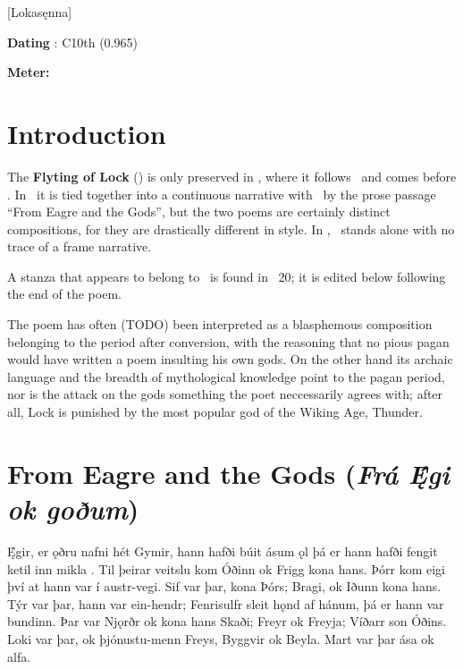 [Lokasęnna]
\def\thisBookCode{Lokasenna}

\begin{flushright}%
\textbf{Dating} \parencite{Sapp2022}: C10th (0.965)

\textbf{Meter:} \Ljodahattr%
\end{flushright}

\section{Introduction}

{\small The \textbf{Flyting of Lock} (\Lokasenna) is only preserved in \Regius, where it follows \Hymiskvida\ and comes before \Thrymskvida.  In \Regius\ it is tied together into a continuous narrative with \Hymiskvida\ by the prose passage “From Eagre and the Gods”, but the two poems are certainly distinct compositions, for they are drastically different in style.  In \AM, \Hymiskvida\ stands alone with no trace of a frame narrative.

A stanza that appears to belong to \Lokasenna\ is found in \Gylfaginning\ 20; it is edited below following the end of the poem.

The poem has often (TODO) been interpreted as a blasphemous composition belonging to the period after conversion, with the reasoning that no pious pagan would have written a poem insulting his own gods.  On the other hand its archaic language and the breadth of mythological knowledge point to the pagan period, nor is the attack on the gods something the poet neccessarily agrees with; after all, Lock is punished by the most popular god of the Wiking Age, Thunder.}

\section{From Eagre and the Gods (\emph{Frá Ę́gi ok goðum})}

\bpg\bpa Ę́gir, er ǫðru nafni hét Gymir, hann hafði búit ásum ǫl þá er hann hafði fengit ketil inn mikla . Til þeirar veitslu kom Óðinn ok Frigg kona hans. Þórr kom eigi því at hann var í austr-vegi. Sif var þar, kona Þórs; Bragi, ok Iðunn kona hans. Týr var þar, hann var ein-hendr; Fenrisulfr sleit hǫnd af hánum, þá er hann var bundinn. Þar var Njǫrðr ok kona hans Skaði; Freyr ok Freyja; Víðarr son Óðins. Loki var þar, ok þjónustu-menn Freys, Byggvir ok Beyla. Mart var þar ása ok alfa.\epa

